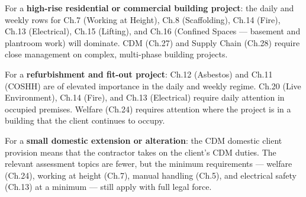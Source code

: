 For a \textbf{high-rise residential or commercial building project}: the daily and weekly rows for Ch.7 (Working at Height), Ch.8 (Scaffolding), Ch.14 (Fire), Ch.13 (Electrical), Ch.15 (Lifting), and Ch.16 (Confined Spaces --- basement and plantroom work) will dominate. CDM (Ch.27) and Supply Chain (Ch.28) require close management on complex, multi-phase building projects.

For a \textbf{refurbishment and fit-out project}: Ch.12 (Asbestos) and Ch.11 (COSHH) are of elevated importance in the daily and weekly regime. Ch.20 (Live Environment), Ch.14 (Fire), and Ch.13 (Electrical) require daily attention in occupied premises. Welfare (Ch.24) requires attention where the project is in a building that the client continues to occupy.

For a \textbf{small domestic extension or alteration}: the CDM domestic client provision means that the contractor takes on the client's CDM duties. The relevant assessment topics are fewer, but the minimum requirements --- welfare (Ch.24), working at height (Ch.7), manual handling (Ch.5), and electrical safety (Ch.13) at a minimum --- still apply with full legal force.

